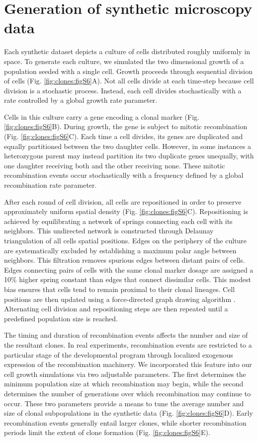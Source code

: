 \section{Generation of synthetic microscopy data}
\label{clones:data_generation}

Each synthetic dataset depicts a culture of cells distributed roughly uniformly in space. To generate each culture, we simulated the two dimensional growth of a population seeded with a single cell. Growth proceeds through sequential division of cells (Fig. \ref{fig:clones:figS6}A). Not all cells divide at each time-step because cell division is a stochastic process. Instead, each cell divides stochastically with a rate controlled by a global growth rate parameter.

Cells in this culture carry a gene encoding a clonal marker (Fig. \ref{fig:clones:figS6}B). During growth, the gene is subject to mitotic recombination (Fig. \ref{fig:clones:figS6}C). Each time a cell divides, its genes are duplicated and equally partitioned between the two daughter cells. However, in some instances a heterozygous parent may instead partition its two duplicate genes unequally, with one daughter receiving both and the other receiving none. These mitotic recombination events occur stochastically with a frequency defined by a global recombination rate parameter. 

After each round of cell division, all cells are repositioned in order to preserve approximately uniform spatial density (Fig. \ref{fig:clones:figS6}C). Repositioning is achieved by equilibrating a network of springs connecting each cell with its neighbors. This undirected network is constructed through Delaunay triangulation of all cells spatial positions. Edges on the periphery of the culture are systematically excluded by establishing a maximum polar angle between neighbors. This filtration removes spurious edges between distant pairs of cells. Edges connecting pairs of cells with the same clonal marker dosage are assigned a 10\% higher spring constant than edges that connect dissimilar cells. This modest bias ensures that cells tend to remain proximal to their clonal lineages. Cell positions are then updated using a force-directed graph drawing algorithm \cite{Kamada1989}. Alternating cell division and repositioning steps are then repeated until a predefined population size is reached. 

The timing and duration of recombination events affects the number and size of the resultant clones. In real experiments, recombination events are restricted to a particular stage of the developmental program through localized exogenous expression of the recombination machinery. We incorporated this feature into our cell growth simulations via two adjustable parameters. The first determines the minimum population size at which recombination may begin, while the second determines the number of generations over which recombination may continue to occur. These two parameters provide a means to tune the average number and size of clonal subpopulations in the synthetic data (Fig. \ref{fig:clones:figS6}D). Early recombination events generally entail larger clones, while shorter recombination periods limit the extent of clone formation (Fig. \ref{fig:clones:figS6}E).

